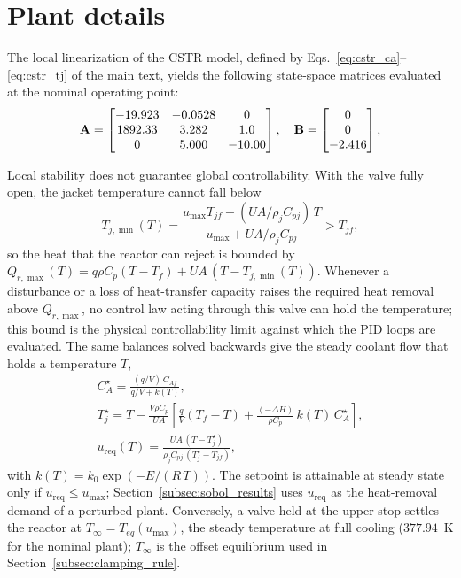 \documentclass[11pt]{article}
\begin{document}
\section{Plant details}\label{supp:plant}
The local linearization of the CSTR model, defined by Eqs.~\eqref{eq:cstr_ca}--\eqref{eq:cstr_tj} of the main text, yields the following state-space matrices evaluated at the nominal operating point:
\begin{equation}
    \setlength{\arraycolsep}{5pt}
    \mathbf{A} = \begin{bmatrix}
        -19.923 & -0.0528 & 0 \\
        1892.33 & 3.282 & 1.0 \\
        0 & 5.000 & -10.00
    \end{bmatrix}, \quad
    \mathbf{B} = \begin{bmatrix} 0 \\ 0 \\ -2.416 \end{bmatrix},
    \label{eq:jacobian_matrices}
\end{equation}

Local stability does not guarantee global controllability. With the valve fully open, the jacket temperature cannot fall below
\begin{equation}
    T_{j,\min}(T) = \frac{u_{\max} T_{jf} + (UA/\rho_j C_{pj})\,T}{u_{\max} + UA/\rho_j C_{pj}} > T_{jf},
    \label{eq:tj_min_bound}
\end{equation}
so the heat that the reactor can reject is bounded by $Q_{r,\max}(T) = q \rho C_p (T - T_f) + UA\,(T - T_{j,\min}(T))$. Whenever a disturbance or a loss of heat-transfer capacity raises the required heat removal above $Q_{r,\max}$, no control law acting through this valve can hold the temperature; this bound is the physical controllability limit against which the PID loops are evaluated. The same balances solved backwards give the steady coolant flow that holds a temperature $T$,
\begin{equation}
    \begin{gathered}
    C_A^\star = \frac{(q/V)\,C_{Af}}{q/V + k(T)}, \\
    T_j^\star = T - \frac{V\rho C_p}{UA}\!\left[\frac{q}{V}(T_f - T) + \frac{(-\Delta H)}{\rho C_p}\,k(T)\,C_A^\star\right], \\
    u_{\mathrm{req}}(T) = \frac{UA\,(T - T_j^\star)}{\rho_j C_{pj}\,(T_j^\star - T_{jf})},
    \end{gathered}
    \label{eq:u_req}
\end{equation}
with $k(T) = k_0\exp(-E/(R\,T))$. The setpoint is attainable at steady state only if $u_{\mathrm{req}} \le u_{\max}$; Section~\ref{subsec:sobol_results} uses $u_{\mathrm{req}}$ as the heat-removal demand of a perturbed plant. Conversely, a valve held at the upper stop settles the reactor at $T_\infty = T_{eq}(u_{\max})$, the steady temperature at full cooling ($377.94$~K for the nominal plant); $T_\infty$ is the offset equilibrium used in Section~\ref{subsec:clamping_rule}.
\end{document}
